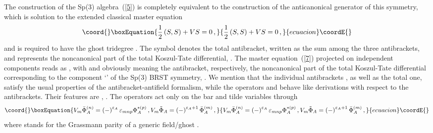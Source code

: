 \documentclass[a4paper,10pt]{article}
\begin{document}
The construction of the Sp(3) algebra~(\ref{5}) is completely equivalent to
the construction of the anticanonical generator \coordHE{} of this symmetry, which
is solution to the extended classical master equation 
\begin{equation}\coord{}\boxEquation{
\label{7}
\frac{1}{2}\left( S,S\right) +VS=0\,,
}{
\frac{1}{2}\left( S,S\right) +VS=0\,,
}{ecuacion}\coordE{}\end{equation}
and is required to have the ghost tridegree \coordHE{}. The symbol \myHighlight{$\left( ,\right) $}\coordHE{} denotes the total
antibracket, written as the sum among the three antibrackets, and \coordHE{}
represents the noncanonical part of the total Koszul-Tate differential, \coordHE{}.
The master equation~(\ref{7})
projected on independent components reads as \coordHE{}, with \coordHE{} and \coordHE{} obviously meaning
the antibracket, respectively, the noncanonical part of the total
Koszul-Tate differential corresponding to the component `\coordHE{}' of the Sp(3)
BRST symmetry, \coordHE{}. 
We mention that the individual antibrackets \coordHE{}, as
well as the total one, satisfy the usual properties of the 
antibracket-antifield formalism, while the operators \coordHE{} and \coordHE{}
behave like derivations with respect to the antibrackets. Their features
are \coordHE{}, \coordHE{}.
The operators \coordHE{} act only on the bar and tilde variables through 
\begin{equation}\coord{}\boxEquation{
\label{20}
V_{m}\bar{\Phi}_{A}^{(n)}=\left( -\right) ^{\varepsilon _{A}}\varepsilon
_{mnp}\Phi _{A}^{*(p)}\,, V_{m}\tilde{\Phi}_{A}=
\left( -\right) ^{\varepsilon
_{A}+1}\bar{\Phi}_{A}^{(m)}\,,
}{
V_{m}\bar{\Phi}_{A}^{(n)}=\left( -\right) ^{\varepsilon _{A}}\varepsilon
_{mnp}\Phi _{A}^{*(p)}\,, V_{m}\tilde{\Phi}_{A}=
\left( -\right) ^{\varepsilon
_{A}+1}\bar{\Phi}_{A}^{(m)}\,,
}{ecuacion}\coordE{}\end{equation}
where \coordHE{} stands for the Grassmann parity of a generic
field/ghost \coordHE{}.
\end{document}
